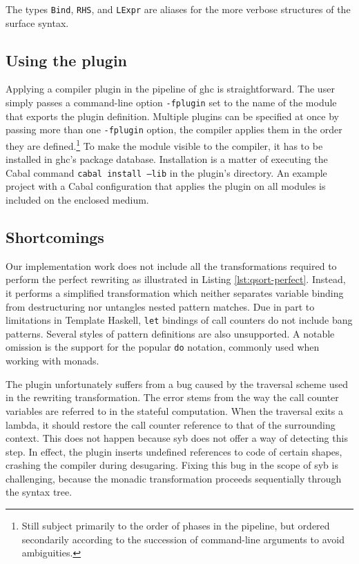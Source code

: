 \documentclass[thesis=B,english]{FITthesis}[2019/12/23]
\newcommand{\hsType}[1]{\texttt{#1}}
\newcommand{\hsCode}[1]{\texttt{#1}}
\begin{document}
The types \hsType{Bind}, \hsType{RHS}, and \hsType{LExpr} are aliases for the
more verbose structures of the surface syntax.

\subsection*{Using the plugin}
Applying a compiler plugin in the pipeline of \acrshort{ghc} is
straightforward. The user simply passes a command-line option \texttt{-fplugin}
set to the name of the module that exports the plugin definition. Multiple
plugins can be specified at once by passing more than one \texttt{-fplugin}
option, the compiler applies them in the order they are defined.\footnote{
	Still subject primarily to the order of phases in the pipeline, but ordered
	secondarily according to the succession of command-line arguments to avoid
	ambiguities.
} To make the module visible to the compiler, it has to be installed in
\acrshort{ghc}'s package database. Installation is a matter of executing the
Cabal command \texttt{cabal install --lib} in the plugin's directory.
An example project with a Cabal configuration that applies the plugin on all
modules is included on the enclosed medium.

\subsection*{Shortcomings}
Our implementation work does not include all the transformations required to
perform the perfect rewriting as illustrated in Listing
\ref{lst:qsort-perfect}. Instead, it performs a simplified transformation which
neither separates variable binding from destructuring nor untangles nested
pattern matches. Due in part to limitations in Template Haskell, \hsCode{let}
bindings of call counters do not include bang patterns. Several styles of
pattern definitions are also unsupported. A notable omission is the support for
the popular \hsCode{do} notation, commonly used when working with monads.

The plugin unfortunately suffers from a bug caused by the traversal scheme used
in the rewriting transformation. The error stems from the way the call counter
variables are referred to in the stateful computation.  When the traversal
exits a lambda, it should restore the call counter reference to that of the
surrounding context. This does not happen because \acrshort{syb} does not offer
a way of detecting this step. In effect, the plugin inserts undefined
references to code of certain shapes, crashing the compiler during desugaring.
Fixing this bug in the scope of \acrshort{syb} is challenging, because the
monadic transformation proceeds sequentially through the syntax tree.
\end{document}
